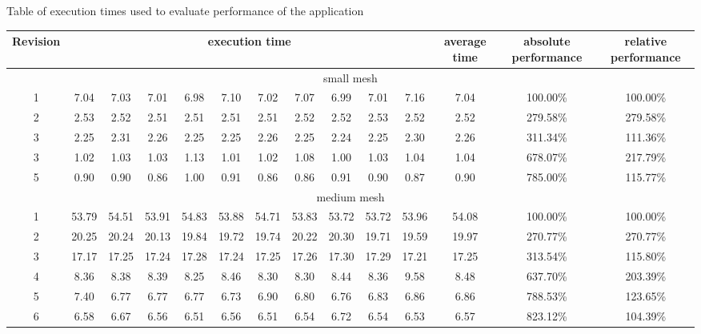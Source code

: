 \documentclass[conference]{IEEEtran}
\begin{document}
\begin{sidewaystable}
\centering
Table of execution times used to evaluate performance of the application\\[10pt]
\begin{tabular}{ |c|c|c|c|c|c|c|c|c|c|c|c|c|c| }
  \hline
  Revision & \multicolumn{10}{|c|}{execution time} & average time & absolute performance & relative performance \\
  \hline \hline
  \multicolumn{14}{|c|}{small mesh} \\ \hline
1 & 7.04 &  7.03 &  7.01 &  6.98 &  7.10 &  7.02 &  7.07 &  6.99 &  7.01 &  7.16 &  7.04 &  100.00\% & 100.00\% \\ \hline
2 & 2.53 &  2.52 &  2.51 &  2.51 &  2.51 &  2.51 &  2.52 &  2.52 &  2.53 &  2.52 &  2.52 &  279.58\% & 279.58\% \\ \hline
3 & 2.25 &  2.31 &  2.26 &  2.25 &  2.25 &  2.26 &  2.25 &  2.24 &  2.25 &  2.30 &  2.26 &  311.34\% & 111.36\% \\ \hline
3 & 1.02 &  1.03 &  1.03 &  1.13 &  1.01 &  1.02 &  1.08 &  1.00 &  1.03 &  1.04 &  1.04 &  678.07\% & 217.79\% \\ \hline
5 & 0.90 &  0.90 &  0.86 &  1.00 &  0.91 &  0.86 &  0.86 &  0.91 &  0.90 &  0.87 &  0.90 &  785.00\% & 115.77\% \\ \hline
\hline
\multicolumn{14}{|c|}{medium mesh} \\ \hline                        
1 & 53.79 & 54.51 & 53.91 & 54.83 & 53.88 & 54.71 & 53.83 & 53.72 & 53.72 & 53.96 & 54.08 & 100.00\% & 100.00\% \\ \hline
2 & 20.25 & 20.24 & 20.13 & 19.84 & 19.72 & 19.74 & 20.22 & 20.30 & 19.71 & 19.59 & 19.97 & 270.77\% & 270.77\% \\ \hline
3 & 17.17 & 17.25 & 17.24 & 17.28 & 17.24 & 17.25 & 17.26 & 17.30 & 17.29 & 17.21 & 17.25 & 313.54\% & 115.80\% \\ \hline
4 & 8.36 &  8.38 &  8.39 &  8.25 &  8.46 &  8.30 &  8.30 &  8.44 &  8.36 &  9.58 &  8.48 & 637.70\% & 203.39\% \\ \hline
5 & 7.40 &  6.77 &  6.77 &  6.77 &  6.73 &  6.90 &  6.80 &  6.76 &  6.83 &  6.86 &  6.86 & 788.53\% & 123.65\% \\ \hline
6 & 6.58 &  6.67 & 6.56 & 6.51 & 6.56 & 6.51 & 6.54 & 6.72 & 6.54 & 6.53 & 6.57 & 823.12\% & 104.39\% \\ \hline
\end{tabular}
\end{sidewaystable}
\end{document}
